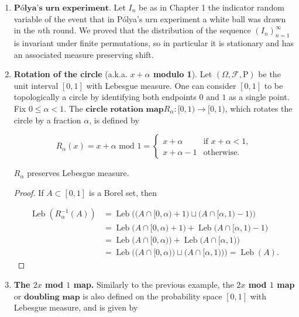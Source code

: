 \begin{enumerate}[label=\arabic*.]
\item $\textbf{Pólya's urn experiment.}$ Let $I_n$ be as in
Chapter 1 the indicator random variable of the event
that in Pólya's urn experiment a white ball was drawn
in the $n$th round. We proved that the distribution
of the sequence $(I_n)_{n=1}^\infty$ is invariant
under finite permutations, so in particular it is
stationary and has an associated measure preserving
shift.

\item \textbf{Rotation of the circle} (a.k.a. \textbf{$x+\alpha$ modulo
1}). Let $(\Omega,\mathcal{F},\mathrm{P})$ be the
unit interval $[0,1]$ with Lebesgue measure. One can
consider $[0,1]$ to be topologically a circle by
identifying both endpoints $0$ and $1$ as a single
point. Fix $0\le \alpha<1$. The
$\textbf{circle rotation map}$$R_\alpha:[0,1)\to[0,1)$, which rotates the circle by
a fraction $\alpha$, is defined by

\[
R_\alpha(x) = x+\alpha \textrm{\ mod\ } 1 = \begin{cases} x+\alpha & \textrm{if }x+\alpha<1, \\ x+\alpha-1&\textrm{otherwise}. \end{cases}
\]

\begin{lem}
$R_\alpha$ preserves Lebesgue measure.
\end{lem}

\begin{proof}
If $A\subset [0,1]$ is a Borel set, then

\begin{align*}
\operatorname{Leb}(R_\alpha^{-1}(A)) &=
\operatorname{Leb}\Big( \big(A\cap[0,\alpha)+1\big) \sqcup \big(A\cap[\alpha,1)-1\big) \Big) \\
&=
\operatorname{Leb}\big(A\cap[0,\alpha)+1\big)
+  \operatorname{Leb}\big(A\cap[\alpha,1)-1\big) \\ &=
\operatorname{Leb}\big(A\cap[0,\alpha)\big)
+  \operatorname{Leb}\big(A\cap[\alpha,1)\big) \\ &=
\operatorname{Leb}\Big( \big(A\cap[0,\alpha)\big) \sqcup \big(A\cap[\alpha,1)\big) \Big)
=
\operatorname{Leb}(A).
\end{align*}

\end{proof}

\item \textbf{The $2x$ mod $1$ map.} Similarly to the previous
example, the \textbf{$2x$ mod $1$ map} or
$\textbf{doubling map}$ is also defined on the
probability space $[0,1]$ with Lebesgue measure, and
is given by


\end{enumerate}
